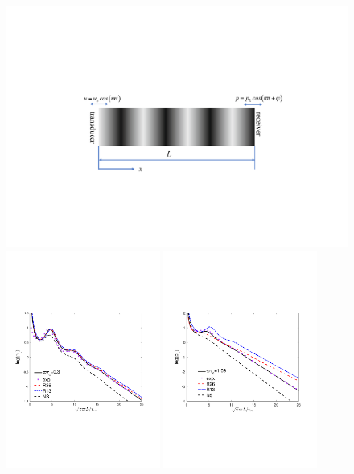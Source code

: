 \begin{figure}[t]
	\centering
	\includegraphics[scale=0.45,viewport=20 10 540 200,clip=true]{Introduction/IMG/resonance.pdf}
	\vskip 0.5cm
	\includegraphics[width=0.45\textwidth]{Introduction/IMG/testOmgTau03.pdf}
	\includegraphics[width=0.45\textwidth]{Introduction/IMG/testOmgTau1_09.pdf}

\end{figure}

